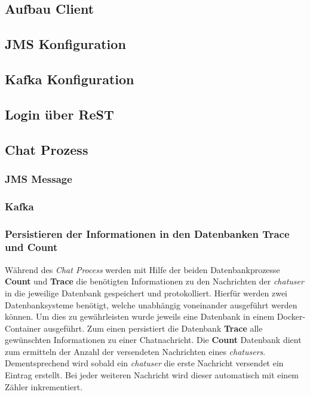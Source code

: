 \documentclass[10pt,journal,compsoc]{IEEEtran}
\begin{document}
\subsection{Aufbau Client}

\subsection{JMS Konfiguration}

\subsection{Kafka Konfiguration}

\subsection{Login über ReST}

\subsection{Chat Prozess}

\subsubsection{JMS Message}

\subsubsection{Kafka}


\subsubsection{Persistieren der Informationen in den Datenbanken Trace und Count}
Während des \textit{Chat Process} werden mit Hilfe der beiden Datenbankprozesse \textbf{Count} und \textbf{Trace} die benötigten Informationen zu den Nachrichten der \textit{chatuser} in die jeweilige Datenbank gespeichert und protokolliert. Hierfür werden zwei Datenbanksysteme benötigt, welche unabhängig voneinander ausgeführt werden können. Um dies zu gewährleisten wurde jeweils eine Datenbank in einem Docker-Container ausgeführt. Zum einen persistiert die Datenbank \textbf{Trace} alle gewünschten Informationen zu einer Chatnachricht. Die \textbf{Count} Datenbank dient zum ermitteln der Anzahl der versendeten Nachrichten eines \textit{chatusers}. Dementsprechend wird sobald ein \textit{chatuser} die erste Nachricht versendet ein Eintrag erstellt. Bei jeder weiteren Nachricht wird dieser automatisch mit einem Zähler inkrementiert. 
\end{document}
